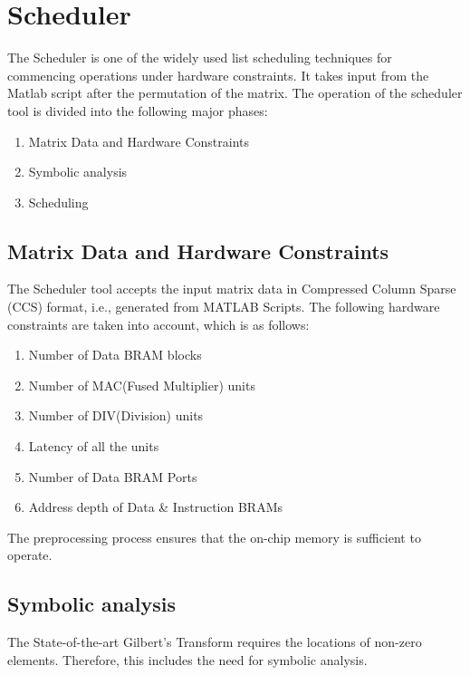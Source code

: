 \chapter{Scheduler}

The Scheduler is one of the widely used list scheduling techniques for commencing operations under hardware constraints. It takes input from the Matlab script after the permutation of the matrix. The operation of the scheduler tool is divided into the following major phases:
\begin{enumerate}
	\item Matrix Data and Hardware Constraints
	\item Symbolic analysis
	\item Scheduling 
\end{enumerate}

\section{Matrix Data and Hardware Constraints}
The Scheduler tool accepts the input matrix data in  Compressed Column Sparse (CCS) format, i.e., generated from MATLAB Scripts. The following hardware constraints are taken into account, which is as follows:
\begin{enumerate}
        \item Number of Data BRAM blocks
        \item Number of MAC(Fused Multiplier) units
        \item Number of DIV(Division) units
        \item Latency of all the units
        \item Number of Data BRAM Ports
        \item Address depth of Data \& Instruction BRAMs
\end{enumerate}
The preprocessing process ensures that the on-chip memory is sufficient to operate.

\section{Symbolic analysis}



The State-of-the-art Gilbert's Transform requires the locations of non-zero elements. Therefore, this includes the need for symbolic analysis. 

